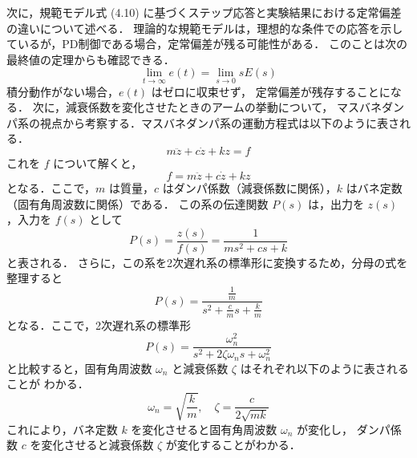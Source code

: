 次に，規範モデル式 (4.10) に基づくステップ応答と実験結果における定常偏差の違いについて述べる．
理論的な規範モデルは，理想的な条件での応答を示しているが，PD制御である場合，定常偏差が残る可能性がある．
このことは次の最終値の定理からも確認できる．
\[
  \lim_{t \to \infty} e(t) = \lim_{s \to 0} s E(s)
\]
積分動作がない場合，\( e(t) \) はゼロに収束せず，
定常偏差が残存することになる．
次に，減衰係数を変化させたときのアームの挙動について，
マスバネダンパ系の視点から考察する．マスバネダンパ系の運動方程式は以下のように表される．
\[
  m \ddot{z} + c \dot{z} + k z = f
\]
これを \( f \) について解くと，
\[
  f = m \ddot{z} + c \dot{z} + k z
\]
となる．ここで，\( m \) は質量，\( c \) はダンパ係数（減衰係数に関係），\( k \) はバネ定数
（固有角周波数に関係）である．
この系の伝達関数 \( P(s) \) は，出力を \( z(s) \) ，入力を \( f(s) \) として
\[
  P(s) = \frac{z(s)}{f(s)} = \frac{1}{m s^2 + c s + k}
\]
と表される．
さらに，この系を2次遅れ系の標準形に変換するため，分母の式を整理すると
\[
  P(s) = \frac{\frac{1}{m}}{s^2 + \frac{c}{m} s + \frac{k}{m}}
\]
となる．ここで，2次遅れ系の標準形
\[
  P(s) = \frac{\omega_n^2}{s^2 + 2 \zeta \omega_n s + \omega_n^2}
\]
と比較すると，固有角周波数 \( \omega_n \) と減衰係数 \( \zeta \) はそれぞれ以下のように表されることが
わかる．
\[
  \omega_n = \sqrt{\frac{k}{m}}, \quad \zeta = \frac{c}{2 \sqrt{m k}}
\]
これにより，バネ定数 \( k \) を変化させると固有角周波数 \( \omega_n \) が変化し，
ダンパ係数 \( c \) を変化させると減衰係数 \( \zeta \) が変化することがわかる．


